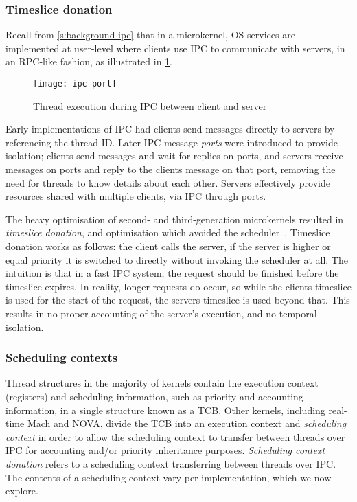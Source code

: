 \subsubsection{Timeslice donation}

Recall from \cref{s:background-ipc} that in a microkernel, \gls{OS} services are implemented at
user-level where clients use \gls{IPC} to communicate with servers, in an \gls{RPC}-like fashion, as
illustrated in \cref{f:os-ipc}.

\begin{figure}
    \centering
    \texttt{[image: ipc-port]}
    \caption{Thread execution during IPC between client and server}
    \label{f:os-ipc}
\end{figure}

Early implementations of IPC had clients send messages directly to servers by referencing the
thread ID. Later IPC message \emph{ports} were introduced to provide isolation; clients send
messages and wait for replies on ports, and servers receive messages on ports and reply to the
clients message on that port, removing the need for threads to know details about each other. 
Servers effectively provide resources shared with multiple clients, via IPC through ports. 

The heavy optimisation of second- and third-generation microkernels resulted in \emph{timeslice
donation}, and optimisation which avoided the scheduler~\citep{Heiser_Elphinstone_16}. 
Timeslice donation works as follows: the client calls the server, if the server is higher or equal
priority it is switched to directly without invoking the scheduler at all. The intuition is that in
a fast IPC system, the request should be finished before the timeslice expires. In reality, longer
requests do occur, so while the clients timeslice is used for the start of the request, the servers
timeslice is used beyond that. This results in no
proper accounting of the server's execution, and no temporal isolation.

\subsubsection{Scheduling contexts}
\label{s:sc-intro}

Thread structures in the majority of kernels contain the execution context (registers) and scheduling
information, such as priority and accounting information, in a single structure known as a \gls{TCB}.
Other kernels, including real-time Mach and NOVA, divide the TCB into an execution context and
\emph{scheduling context} in order to allow the scheduling context to
transfer between threads over \gls{IPC} for accounting and/or priority inheritance purposes.
\emph{Scheduling context donation} refers to a scheduling context transferring between threads over
\gls{IPC}. The contents of a scheduling context vary per implementation, which we now explore.


